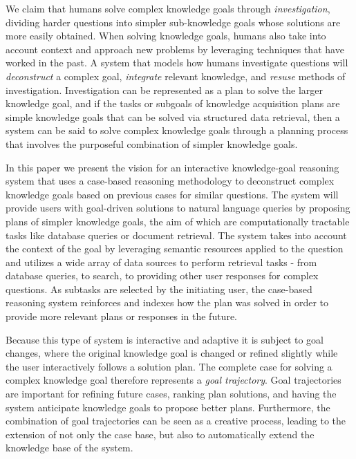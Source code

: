 \documentclass{llncs}
\begin{document}
We claim that humans solve complex knowledge goals through \textit{investigation}, dividing harder questions into simpler sub-knowledge goals whose solutions are more easily obtained. When solving knowledge goals, humans also take into account context and approach new problems by leveraging techniques that have worked in the past. A system that models how humans investigate questions will \textit{deconstruct} a complex goal, \textit{integrate} relevant knowledge, and \textit{resuse} methods of investigation. Investigation can be represented as a plan to solve the larger knowledge goal, and if the tasks or subgoals of knowledge acquisition plans are simple knowledge goals that can be solved via structured data retrieval, then a system can be said to solve complex knowledge goals through a planning process that involves the purposeful combination of simpler knowledge goals.

In this paper we present the vision for an interactive knowledge-goal reasoning system that uses a case-based reasoning methodology to deconstruct complex knowledge goals based on previous cases for similar questions. The system will provide users with goal-driven solutions to natural language queries by proposing plans of simpler knowledge goals, the aim of which are computationally tractable tasks like database queries or document retrieval. The system takes into account the context of the goal by leveraging semantic resources applied to the question and utilizes a wide array of data sources to perform retrieval tasks - from database queries, to search, to providing other user responses for complex questions. As subtasks are selected by the initiating user, the case-based reasoning system reinforces and indexes how the plan was solved in order to provide more relevant plans or responses in the future.

Because this type of system is interactive and adaptive it is subject to goal changes, where the original knowledge goal is changed or refined slightly while the user interactively follows a solution plan. The complete case for solving a complex knowledge goal therefore represents a \textit{goal trajectory}. Goal trajectories are important for refining future cases, ranking plan solutions, and having the system anticipate knowledge goals to propose better plans. Furthermore, the combination of goal trajectories can be seen as a creative process, leading to the extension of not only the case base, but also to automatically extend the knowledge base of the system.

\end{document}
